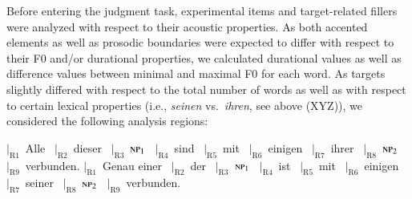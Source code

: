 \documentclass[fleqn,reqno,10pt,draft]{article}
\begin{document}
Before entering the judgment task, experimental items and
target-related fillers were analyzed with respect to their acoustic
properties. As both accented elements as well as prosodic boundaries
were expected to differ with respect to their F0 and/or durational
properties, we calculated durational values as well as difference
values between minimal and maximal F0 for each word. As targets
slightly differed with respect to the total number of words as well as
with respect to certain lexical properties (i.e., \emph{seinen}
vs.~\emph{ihren}, see above (XYZ)), we considered
the following analysis regions:

\begin{exe}
  \ex
    \begin{xlist}
      \ex $|_{\text{R}1}$~Alle  	\ $|_{\text{R}2}$~dieser 
      \ $|_{\text{R}3}$~$\textsc{np}_1$  
      \ $|_{\text{R}4}$~sind  \ $|_{\text{R}5}$~mit  \
      $|_{\text{R}6}$~einigen  \ $|_{\text{R}7}$~ihrer 
       \ $|_{\text{R}8}$~{$\textsc{np}_2$}  \ $|_{\text{R}9}$~verbunden.
    \ex       $|_{\text{R}1}$~Genau einer  	\ $|_{\text{R}2}$~der 
      \ $|_{\text{R}3}$~$\textsc{np}_1$  
      \ $|_{\text{R}4}$~ist  \ $|_{\text{R}5}$~mit  \
      $|_{\text{R}6}$~einigen  \ $|_{\text{R}7}$~seiner 
       \ $|_{\text{R}8}$~{$\textsc{np}_2$}  \ $|_{\text{R}9}$~verbunden.
    \end{xlist}
\end{exe}
\end{document}
